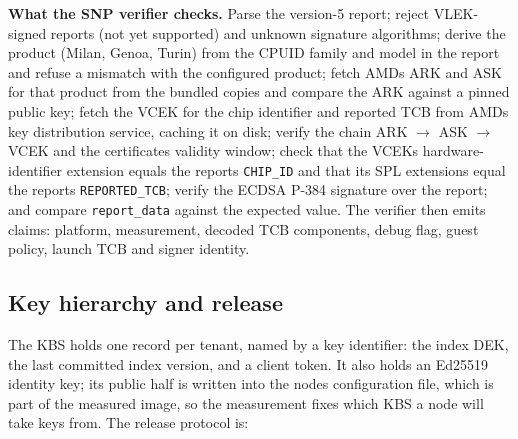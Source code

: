 \documentclass[letterpaper,twocolumn,10pt]{article}
\begin{document}
\textbf{What the SNP verifier checks.} Parse the version-5 report; reject VLEK-signed reports (not yet supported) and unknown signature algorithms; derive the product (Milan, Genoa, Turin) from the CPUID family and model in the report and refuse a mismatch with the configured product; fetch AMD\textquotesingle s ARK and ASK for that product from the bundled copies and compare the ARK against a pinned public key; fetch the VCEK for the chip identifier and reported TCB from AMD\textquotesingle s key distribution service, caching it on disk; verify the chain ARK $\rightarrow$ ASK $\rightarrow$ VCEK and the certificates\textquotesingle{} validity window; check that the VCEK\textquotesingle s hardware-identifier extension equals the report\textquotesingle s \texttt{CHIP\_ID} and that its SPL extensions equal the report\textquotesingle s \texttt{REPORTED\_TCB}; verify the ECDSA P-384 signature over the report; and compare \texttt{report\_data} against the expected value. The verifier then emits claims: platform, measurement, decoded TCB components, debug flag, guest policy, launch TCB and signer identity.

\subsection{Key hierarchy and release}\label{key-hierarchy-and-release}

The KBS holds one record per tenant, named by a key identifier: the index DEK, the last committed index version, and a client token. It also holds an Ed25519 identity key; its public half is written into the node\textquotesingle s configuration file, which is part of the measured image, so the measurement fixes which KBS a node will take keys from. The release protocol is:
\end{document}
